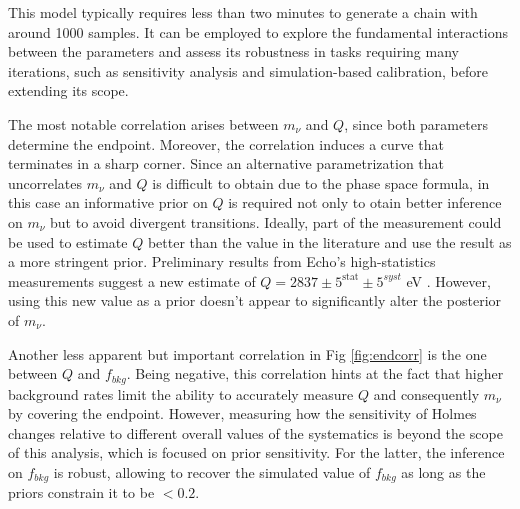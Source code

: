 This model typically requires less than two minutes to generate a chain with around 1000 samples. It can be employed to explore the fundamental interactions between the parameters and assess its robustness in tasks requiring many iterations, such as sensitivity analysis and simulation-based calibration, before extending its scope.

The most notable correlation arises between $m_\nu$ and $Q$, since both parameters determine the endpoint.
 Moreover, the correlation induces a curve that terminates in a sharp corner. Since an
alternative parametrization that uncorrelates $m_\nu$ and $Q$ is difficult to obtain due to the
phase space formula, in this case an informative prior on $Q$ is required not only to otain better inference on  $m_\nu$ but
to avoid divergent transitions. Ideally, part of the measurement could be used to estimate $Q$ better than the value in
the literature and use the result as a more stringent prior. 
Preliminary results from Echo's high-statistics measurements suggest a new estimate of $Q=2837\pm 5^{\text{stat}}\pm
5^{syst}$ eV  \cite{velte2020measurement}. However, using this new value as a prior doesn't appear to significantly alter
the posterior of $m_\nu$.

Another less apparent but important correlation in Fig \ref{fig:endcorr} is the one between $Q$ and  $f_{bkg}$. Being negative, this
correlation hints at the fact that higher background rates limit the ability to accurately measure $Q$ and consequently
$m_\nu$ by covering the
endpoint. However, measuring how
the sensitivity of Holmes changes relative to different overall values of the systematics is beyond the scope of this analysis, which is focused on prior sensitivity. For the latter, the inference on $f_{bkg}$ is robust, allowing to recover the
simulated value of $f_{bkg}$ as long as the priors constrain it to be $<0.2$.

